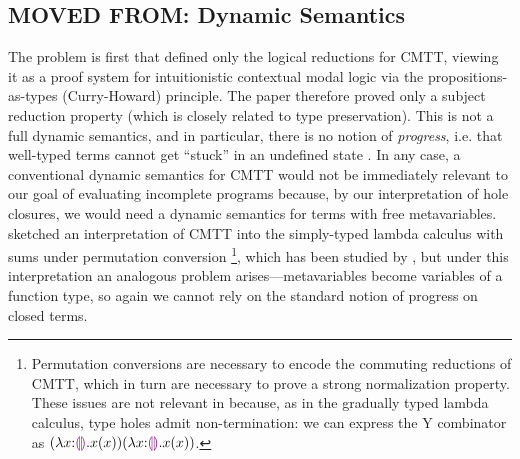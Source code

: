 %
%
%
\subsection{MOVED FROM: Dynamic Semantics}


The problem is first that \citet{Nanevski2008} defined only the logical reductions for CMTT, viewing it as a proof system for intuitionistic contextual modal logic via the propositions-as-types (Curry-Howard) principle. 
The paper therefore proved only a subject reduction property (which is closely related to type preservation). 
This is not a full dynamic semantics, and in particular, there is no notion of \emph{progress}, i.e. that well-typed terms cannot get ``stuck'' in an undefined state \cite{wright94:_type_soundness}. 
In any case, a conventional dynamic semantics for CMTT would not be immediately relevant to our goal of evaluating incomplete programs because, by our interpretation of hole closures, we would need a dynamic semantics for terms with free metavariables. 
\citet{Nanevski2008} sketched an interpretation of CMTT into the simply-typed lambda calculus with sums under permutation conversion%
\footnote{Permutation conversions are necessary to encode the commuting reductions of CMTT, which in turn are necessary to prove a strong normalization property. These issues are not relevant in \HazelnutLive because, as in the gradually typed lambda calculus, type holes admit non-termination: we can express the Y combinator as $(\lambda x{:}\textcolor{violet}{\llparenthesis}\textcolor{violet}{\rrparenthesis}.x(x)) (\lambda x{:}\textcolor{violet}{\llparenthesis}\textcolor{violet}{\rrparenthesis}.x(x))$.}, 
which has been studied by \citet{DBLP:journals/iandc/Groote02}, 
but under this interpretation an analogous problem arises---metavariables become variables of a function type, so again we cannot rely on the standard notion of progress on closed terms.%

